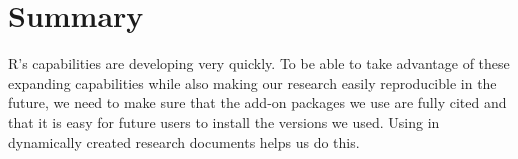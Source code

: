 \section{Summary}

R's capabilities are developing very quickly. To be able to take advantage of these expanding capabilities while also making our research easily reproducible in the future, we need to make sure that the add-on packages we use are fully cited and that it is easy for future users to install the versions we used. Using  in dynamically created research documents helps us do this. 



\address{Christopher Gandrud\\
  Yonsei University\\
  1 Yonseidae-Gil, Wonju \\
  Gangwon-do, 220-710\\
  Republic of Korea} \\

